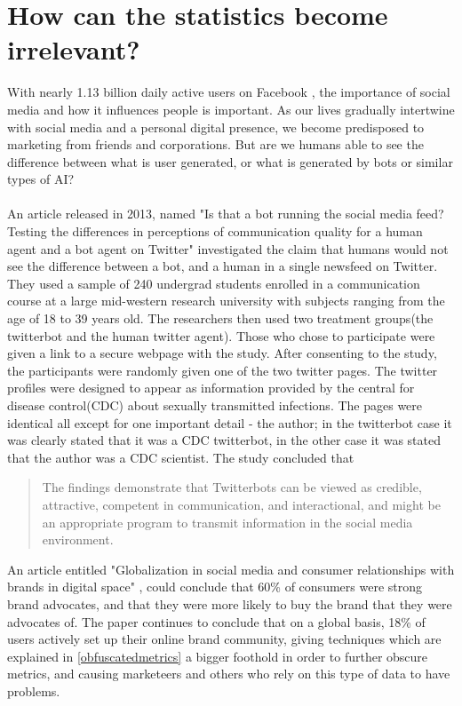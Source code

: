 \section{How can the statistics become irrelevant?}\label{botrunningfeed}
With nearly 1.13 billion daily active users on Facebook \cite{FB:stats}, the importance of social media and how it influences people is important. As our lives gradually intertwine with social media and a personal digital presence, we become predisposed to marketing from friends and corporations.  But are we humans able to see the difference between what is user generated, or what is generated by bots or similar types of AI?
\\
\\
An article released in 2013, named "Is that a bot running the social media feed? Testing the differences in perceptions of communication quality for a human agent and a bot agent on Twitter"\cite{Edwards2014372} investigated the claim that humans would not see the difference between a bot, and a human in a single newsfeed on Twitter. They used a sample of 240 undergrad students enrolled in a communication course at a large mid-western research university with subjects ranging from the age of 18 to 39 years old. The researchers then used two treatment groups(the twitterbot and the human twitter agent). Those who chose to participate were given a link to a secure webpage with the study. After consenting to the study, the participants were randomly given one of the two twitter pages. The twitter profiles were designed to appear as information provided by the central for disease control(CDC) about sexually transmitted infections. The pages were identical all except for one important detail - the author; in the twitterbot case it was clearly stated that it was a CDC twitterbot, in the other case it was stated that the author was a CDC scientist. The study concluded that
 \begin{quote}
The findings demonstrate that Twitterbots can be viewed as credible, attractive,
competent in communication, and interactional, and might be an
appropriate program to transmit information in the social media
environment. 
\newline \mbox{} \hfill \citet{Edwards2014372}

\end{quote}
An article entitled "Globalization in social media and consumer relationships with brands in digital space" \cite{6959277120111201}, could conclude that 60\% of consumers\cite{6959277120111201} were strong brand advocates, and that they were more likely to buy the brand that they were advocates of. The paper continues to conclude that on a global basis, 18\% of users actively set up their online brand community\cite{6959277120111201}, giving techniques which are explained in \ref{obfuscatedmetrics} a bigger foothold in order to further obscure metrics, and causing marketeers and others who rely on this type of data to have problems.
\newpage
